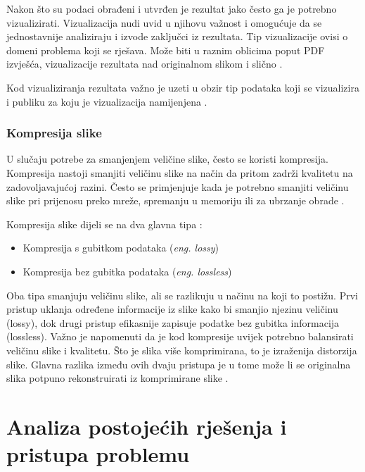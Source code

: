 \documentclass{foi}
\begin{document}
Nakon što su podaci obrađeni i utvrđen je rezultat jako često ga je potrebno vizualizirati. Vizualizacija nudi uvid u njihovu važnost i omogućuje da se jednostavnije analiziraju i izvode zaključci iz rezultata. 
Tip vizualizacije ovisi o domeni problema koji se rješava. Može biti u raznim oblicima poput PDF izvješća, vizualizacije rezultata nad originalnom slikom i slično  \cite{Visulization}.

Kod vizualiziranja rezultata važno je uzeti u obzir tip podataka koji se vizualizira i publiku za koju je vizualizacija namijenjena \cite{Visulization}. 

\subsubsection{Kompresija slike}

U slučaju potrebe za smanjenjem veličine slike, često se koristi kompresija. Kompresija nastoji smanjiti veličinu slike na način da pritom zadrži kvalitetu na zadovoljavajućoj razini. Često se primjenjuje kada je potrebno smanjiti veličinu slike pri prijenosu preko mreže, spremanju u memoriju ili za ubrzanje obrade \cite{ImageProcessing}.

\begin{flushleft}
Kompresija slike dijeli se na dva glavna tipa \cite{Compression}:
\begin{itemize}
    \item Kompresija s gubitkom podataka (\textit{eng. lossy})
    \item Kompresija bez gubitka podataka (\textit{eng. lossless})
\end{itemize}
\end{flushleft}

Oba tipa smanjuju veličinu slike, ali se razlikuju u načinu na koji to postižu.  
Prvi pristup uklanja određene informacije iz slike kako bi smanjio njezinu veličinu (lossy), dok drugi pristup efikasnije zapisuje podatke bez gubitka informacija (lossless).  
Važno je napomenuti da je kod kompresije uvijek potrebno balansirati veličinu slike i kvalitetu. Što je slika više komprimirana, to je izraženija distorzija slike.  
Glavna razlika između ovih dvaju pristupa je u tome može li se originalna slika potpuno rekonstruirati iz komprimirane slike \cite{Compression}.


\section{Analiza postojećih rješenja i pristupa problemu}
\end{document}
